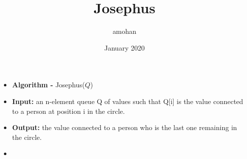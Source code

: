 \documentclass{article}
\title{Josephus}
\author{amohan }
\date{January 2020}
\begin{document}
\begin{itemize}
\item[]
\textbf{Algorithm - }Josephus($Q$)
\item[]
\textbf{Input:} an n-element queue Q of values such that Q[i] is the value connected to a person at position i in the circle.
\item[]
\textbf{Output:} the value connected to a person who is the last one remaining in the circle.


\item[]


\end{itemize}
\end{document}
